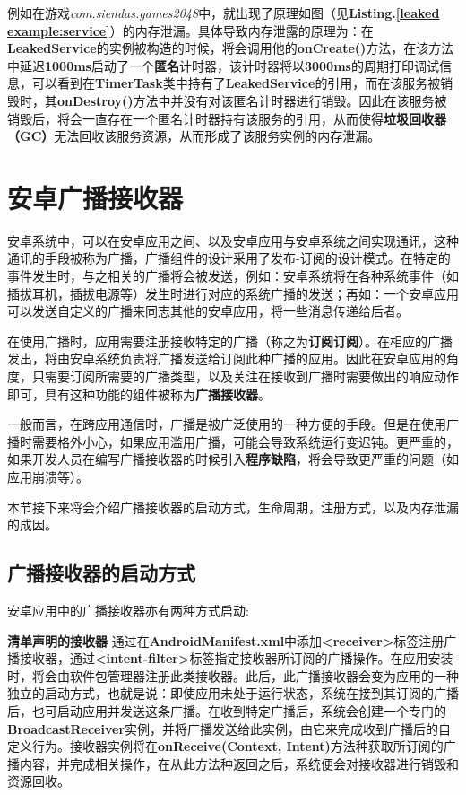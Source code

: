 例如在游戏\emph{com.siendas.games2048}中，就出现了原理如图（见\textbf{Listing.\textcolor{red}{\ref{leaked example:service}}}）的内存泄漏。具体导致内存泄露的原理为：在\textbf{LeakedService}的实例被构造的时候，将会调用他的\textbf{onCreate()}方法，在该方法中延迟\textbf{1000ms}启动了一个\textbf{匿名}计时器，该计时器将以\textbf{3000ms}的周期打印调试信息，可以看到在\textbf{TimerTask}类中持有了\textbf{LeakedService}的引用，而在该服务被销毁时，其\textbf{onDestroy()}方法中并没有对该匿名计时器进行销毁。因此在该服务被销毁后，将会一直存在一个匿名计时器持有该服务的引用，从而使得\textbf{垃圾回收器（GC）}无法回收该服务资源，从而形成了该服务实例的内存泄漏。

\section{安卓广播接收器}\label{broadcast}

安卓系统中，可以在安卓应用之间、以及安卓应用与安卓系统之间实现通讯，这种通讯的手段被称为广播\cite{androidbroadcastsguide}，广播组件的设计采用了发布-订阅的设计模式。在特定的事件发生时，与之相关的广播将会被发送，例如：安卓系统将在各种系统事件（如插拔耳机，插拔电源等）发生时进行对应的系统广播的发送；再如：一个安卓应用可以发送自定义的广播来同志其他的安卓应用，将一些消息传递给后者。

在使用广播时，应用需要注册接收特定的广播（称之为\textbf{订阅订阅}）。在相应的广播发出，将由安卓系统负责将广播发送给订阅此种广播的应用。因此在安卓应用的角度，只需要订阅所需要的广播类型，以及关注在接收到广播时需要做出的响应动作即可，具有这种功能的组件被称为\textbf{广播接收器}。
	
一般而言，在跨应用通信时，广播是被广泛使用的一种方便的手段。但是在使用广播时需要格外小心，如果应用滥用广播，可能会导致系统运行变迟钝。更严重的，如果开发人员在编写广播接收器的时候引入\textbf{程序缺陷}，将会导致更严重的问题（如应用崩溃等）。

本节接下来将会介绍广播接收器的启动方式，生命周期，注册方式，以及内存泄漏的成因。

\subsection{广播接收器的启动方式}
安卓应用中的广播接收器亦有两种方式启动\cite{broadcast}:

\textbf{清单声明的接收器 }\label{declaration:receiver in manifest} 通过在\textbf{AndroidManifest.xml}中添加\textbf{<receiver>}标签注册广播接收器，通过\textbf{<intent-filter>}标签指定接收器所订阅的广播操作。在应用安装时，将会由软件包管理器注册此类接收器。此后，此广播接收器会变为应用的一种独立的启动方式，也就是说：即使应用未处于运行状态，系统在接到其订阅的广播后，也可启动应用并发送这条广播。在收到特定广播后，系统会创建一个专门的\textbf{BroadcastReceiver}实例，并将广播发送给此实例，由它来完成收到广播后的自定义行为。接收器实例将在\textbf{onReceive(Context, Intent)}方法种获取所订阅的广播内容，并完成相关操作，在从此方法种返回之后，系统便会对接收器进行销毁和资源回收。


